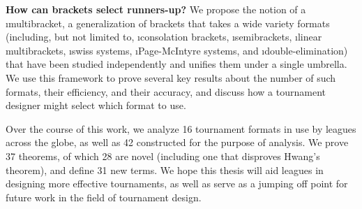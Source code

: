 {    {\bf How can brackets select runners-up?} We propose the notion of a \i{multibracket}, a generalization of brackets that takes a wide variety formats (including, but not limited to, \i{consolation brackets}, \i{semibrackets}, \i{linear multibrackets}, \i{swiss systems}, \i{Page-McIntyre systems}, and \i{double-elimination}) that have been studied independently and unifies them under a single umbrella. We use this framework to prove several key results about the number of such formats, their efficiency, and their accuracy, and discuss how a tournament designer might select which format to use.

    Over the course of this work, we analyze 16 tournament formats in use by leagues across the globe, as well as 42 constructed for the purpose of analysis. We prove 37 theorems, of which 28 are novel (including one that disproves Hwang's theorem), and define 31 new terms. We hope this thesis will aid leagues in designing more effective tournaments, as well as serve as a jumping off point for future work in the field of tournament design.
}


